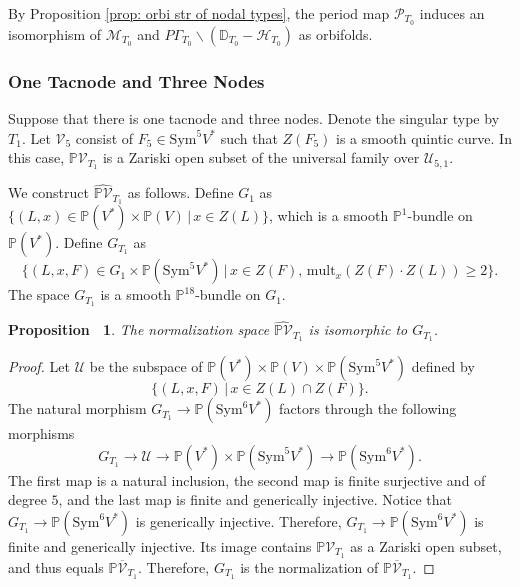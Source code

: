 \documentclass[12pt,reqno,a4paper]{amsart}
\newtheorem{prop}[thm]{Proposition~}
\theoremstyle{remark}
\theoremstyle{definition}
\begin{document}
By Proposition \ref{prop: orbi str of nodal types}, the period map $\mathscr{P}_{T_0}$ induces an isomorphism of $\mathcal{M}_{T_0}$ and $P\Gamma_{T_0}\backslash(\mathbb{D}_{T_0}-\mathcal{H}_{T_0})$ as orbifolds. 


\subsubsection{One Tacnode and Three Nodes}
Suppose that there is one tacnode and three nodes. Denote the singular type by $T_1$.
Let $\mathcal{V}_{5}$ consist of $F_5\in\mathrm{Sym}^5 V^*$ such that $Z(F_5)$ is a smooth quintic curve.
In this case, $\mathbb{P}\mathcal{V}_{T_1}$ is a Zariski open subset of the universal family over $\mathcal{U}_{5,1}$.

We construct $\widehat{\mathbb{P}\mathcal{V}}_{T_1}$ as follows. Define $G_1$ as $\{ 
(L,x)\in\mathbb{P}(V^*)\times\mathbb{P}(V) \,|\, x\in Z(L) \}$, which is a smooth $\mathbb{P}^1$-bundle on $\mathbb{P}(V^*)$. Define $G_{T_1}$ as 
\begin{equation*}
    \{ (L,x,F)\in G_1\times\mathbb{P}(\mathrm{Sym}^5 V^*) \,|\, x\in Z(F),\, \mathrm{mult}_x(Z(F)\cdot Z(L))\ge 2 \}.
\end{equation*}
The space $G_{T_1}$ is a smooth $\mathbb{P}^{18}$-bundle on $G_1$.
\begin{prop}
\label{prop: normalization for quintic plus 1 tangent}
    The normalization space $\widehat{\mathbb{P}\mathcal{V}}_{T_1}$ is isomorphic to $G_{T_1}$.
\end{prop}
\begin{proof}
    Let $\mathcal{U}$ be the subspace of $\mathbb{P}(V^*)\times\mathbb{P}(V)\times\mathbb{P}(\mathrm{Sym}^5 V^*)$ defined by 
    \begin{equation*}
        \{ (L,x,F) \,|\, x\in Z(L)\cap Z(F) \}.
    \end{equation*}
    The natural morphism $G_{T_1}\to \mathbb{P}(\mathrm{Sym}^6 V^*)$ factors through the following morphisms
    \begin{equation*}
        G_{T_1} \to \mathcal{U} \to \mathbb{P}(V^*)\times\mathbb{P}(\mathrm{Sym}^5 V^*) \to \mathbb{P}(\mathrm{Sym}^6 V^*).
    \end{equation*}
    The first map is a natural inclusion, the second map is finite surjective and of degree $5$, and the last map is finite and generically injective. Notice that $G_{T_1}\to \mathbb{P}(\mathrm{Sym}^6 V^*)$ is generically injective. Therefore, $G_{T_1}\to \mathbb{P}(\mathrm{Sym}^6 V^*)$ is finite and generically injective.
    Its image contains $\mathbb{P}\mathcal{V}_{T_1}$ as a Zariski open subset, and thus equals $\mathbb{P}\overline{\mathcal{V}}_{T_1}$. Therefore, $G_{T_1}$ is the normalization of $\mathbb{P}\overline{\mathcal{V}}_{T_1}$.
\end{proof}
\end{document}
